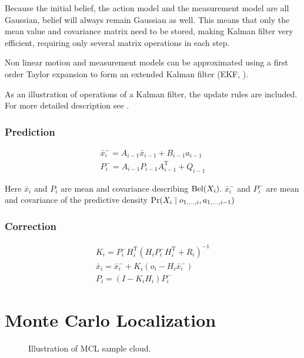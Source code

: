 Because the initial belief, the action model and the measurement model are all Gaussian,
belief will always remain Gaussian as well.
This means that only the mean value and covariance matrix need to be stored, making
Kalman filter very efficient, requiring only several matrix operations in each step.

Non linear motion and measurement models can be approximated
using a first order Taylor expansion to form an extended Kalman
filter (EKF, \cite{welch95}).

As an illustration of operations of a Kalman filter, the update rules are included.
For more detailed description see \cite{welch95}.

\subsubsection{Prediction}
\begin{gather}
	\bar{x}^{-}_i = A_{i - 1}\bar{x}_{i-1} + B_{i - 1}a_{i - 1}
	\\
	P^{-}_i = A_{i - 1}P_{i - 1}A^{\mathrm{T}}_{i - 1} + Q_{i - 1}
\end{gather}

Here \(\bar{x}_i\) and \(P_i\) are mean and covariance describing \(\operatorname{\mathrm{Bel}}(X_i)\).
\(\bar{x}^{-}_i\) and \(P^{-}_i\) are mean and covariance of the predictive density
\(\operatorname{\mathrm{Pr}}(X_i \mid o_{1, \dotsc, i}, a_{1, \dotsc, i - 1})\)

\subsubsection{Correction}
\begin{gather}
	\label{eq:kalman-gain}
	K_i = P^{-}_{i}H^{\mathrm{T}}_{i}(H_{i}P^{-}_{i}H^{\mathrm{T}}_{i} + R_{i})^{-1}
	\\
	\bar{x}_i = \bar{x}^{-}_i + K_i (o_i - H_{i}\bar{x}^{-}_i)
	\\
	P_i = (I - K_{i}H_{i})P^{-}_i
\end{gather}


\section{Monte Carlo Localization}
\label{sec:mcl-algorithm}

\begin{figure}[tp]
	\centering
	
	\caption{Illustration of MCL sample cloud.}
	\label{fig:mcl}
\end{figure}

